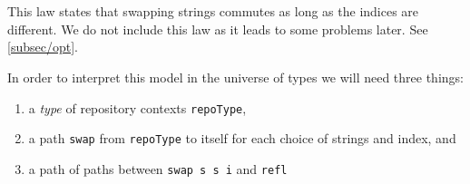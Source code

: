 \begin{code}%
\>[0][@{}l@{\AgdaIndent{1}}]%
\>[2]%
\>[174I]\AgdaSymbol{:}%
\>[175I]\AgdaSymbol{(}\AgdaSpace{}%
\AgdaSpace{}%
\AgdaSpace{}%
\AgdaSpace{}%
\AgdaSymbol{:}\AgdaSpace{}%
\AgdaSymbol{)}\AgdaSpace{}%
\AgdaSymbol{(}\AgdaSpace{}%
\AgdaSpace{}%
\AgdaSymbol{:}\AgdaSpace{}%
\AgdaSpace{}%
\AgdaSymbol{)}\AgdaSpace{}%
\AgdaSpace{}%
\AgdaSymbol{(}\AgdaSpace{}%
\AgdaSpace{}%
\AgdaSymbol{)}\AgdaSpace{}%
\<%
\\
\>[.][@{}l@{}]\<[175I]%
\>[10]\AgdaSymbol{(}\AgdaSpace{}%
\AgdaSpace{}%
\AgdaSpace{}%
\AgdaSpace{}%
\AgdaSymbol{)}\AgdaSpace{}%
\AgdaSpace{}%
\AgdaSymbol{(}\AgdaSpace{}%
\AgdaSpace{}%
\AgdaSpace{}%
\AgdaSpace{}%
\AgdaSymbol{)}\<%
\\
\>[.][@{}l@{}]\<[174I]%
\>[8]\AgdaSpace{}%
\AgdaSymbol{(}\AgdaSpace{}%
\AgdaSpace{}%
\AgdaSpace{}%
\AgdaSpace{}%
\AgdaSymbol{)}\AgdaSpace{}%
\AgdaSpace{}%
\AgdaSymbol{(}\AgdaSpace{}%
\AgdaSpace{}%
\AgdaSpace{}%
\AgdaSpace{}%
\AgdaSymbol{)}\<%
\end{code}

This law states that swapping strings commutes as long as the indices are different.
We do not include this law as it leads to some problems later. See \autoref{subsec/opt}.

In order to interpret this model in the universe of types we will need three things:
\begin{enumerate}
  \item a \emph{type} of repository contexts \texttt{repoType},
  \item a path \texttt{swap} from \texttt{repoType} to itself for
        each choice of strings and index, and
  \item a path of paths between \texttt{swap s s i} and \texttt{refl}
\end{enumerate}

